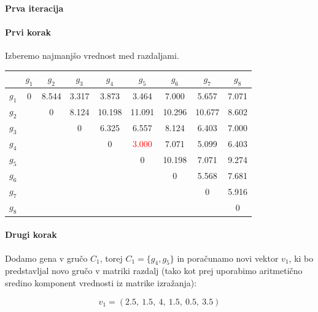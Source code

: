 \documentclass{article}
\begin{document}
\begin{enumerate}
		\begin{center}
			\paragraph{Prva iteracija}
		\end{center}

		\paragraph{Prvi korak} Izberemo najmanjšo vrednost med razdaljami.

		\begin{center}
			\begin{tabular}{c||c|c|c|c|c|c|c|c|}
				& $g_1$ & $g_2$ & $g_3$ & $g_4$ & $g_5$ & $g_6$ & $g_7$ & $g_8$ \\
				\hline
				\hline
				$g_1$ & 0     & 8.544 & 3.317 & 3.873 & 3.464 & 7.000 & 5.657 & 7.071 \\
				\hline
				$g_2$ &       & 0     & 8.124 & 10.198 & 11.091 & 10.296 & 10.677 & 8.602 \\
				\hline
				$g_3$ &       &       & 0     & 6.325 & 6.557  & 8.124  & 6.403 & 7.000 \\
				\hline
				$g_4$ &       &       &       & 0     & \textcolor{red}{3.000}  & 7.071  & 5.099 & 6.403 \\
				\hline
				$g_5$ &       &       &       &       & 0      & 10.198 & 7.071 & 9.274 \\
				\hline
				$g_6$ &       &       &       &       &        & 0      & 5.568 & 7.681 \\
				\hline
				$g_7$ &       &       &       &       &        &        & 0     & 5.916 \\
				\hline
				$g_8$ &       &       &       &       &        &        &        & 0     \\
			\end{tabular}
		\end{center}

		\paragraph{Drugi korak} Dodamo gena v gručo $C_1$, torej $C_1 = \{g_4, g_5\}$ in poračunamo
		novi vektor $v_1$, ki bo predstavljal novo gručo v matriki razdalj (tako kot prej uporabimo
		aritmetično sredino komponent vrednosti iz matrike izražanja):

		$$
		v_1 = (2.5, \ 1.5, \ 4, \ 1.5, \ 0.5, \ 3.5)
		$$


\end{enumerate}
\end{document}

